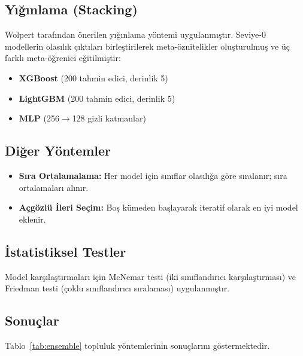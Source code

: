 \documentclass[conference]{IEEEtran}
\begin{document}
\subsection{Y{\i}\u{g}{\i}nlama (Stacking)}
Wolpert \cite{wolpert1992stacked} taraf{\i}ndan \"{o}nerilen y{\i}\u{g}{\i}nlama y\"{o}ntemi uygulanm{\i}\c{s}t{\i}r. Seviye-0 modellerin olas{\i}l{\i}k \c{c}{\i}kt{\i}lar{\i} birle\c{s}tirilerek meta-\"{o}znitelikler olu\c{s}turulmu\c{s} ve \"{u}\c{c} farkl{\i} meta-\"{o}\u{g}renici e\u{g}itilmi\c{s}tir:
\begin{itemize}
    \item \textbf{XGBoost} (200 tahmin edici, derinlik 5)
    \item \textbf{LightGBM} (200 tahmin edici, derinlik 5)
    \item \textbf{MLP} (256$\rightarrow$128 gizli katmanlar)
\end{itemize}

\subsection{Di\u{g}er Y\"{o}ntemler}
\begin{itemize}
    \item \textbf{S{\i}ra Ortalamalama:} Her model i\c{c}in s{\i}n{\i}flar olas{\i}l{\i}\u{g}a g\"{o}re s{\i}ralan{\i}r; s{\i}ra ortalamalar{\i} al{\i}n{\i}r.
    \item \textbf{A\c{c}g\"{o}zl\"{u} \.{I}leri Se\c{c}im:} Bo\c{s} k\"{u}meden ba\c{s}layarak iteratif olarak en iyi model eklenir.
\end{itemize}

\subsection{\.{I}statistiksel Testler}
Model kar\c{s}{\i}la\c{s}t{\i}rmalar{\i} i\c{c}in McNemar testi (iki s{\i}n{\i}fland{\i}r{\i}c{\i} kar\c{s}{\i}la\c{s}t{\i}rmas{\i}) ve Friedman testi (\c{c}oklu s{\i}n{\i}fland{\i}r{\i}c{\i} s{\i}ralamas{\i}) uygulanm{\i}\c{s}t{\i}r.

\subsection{Sonu\c{c}lar}
Tablo~\ref{tab:ensemble} topluluk y\"{o}ntemlerinin sonu\c{c}lar{\i}n{\i} g\"{o}stermektedir.
\end{document}
